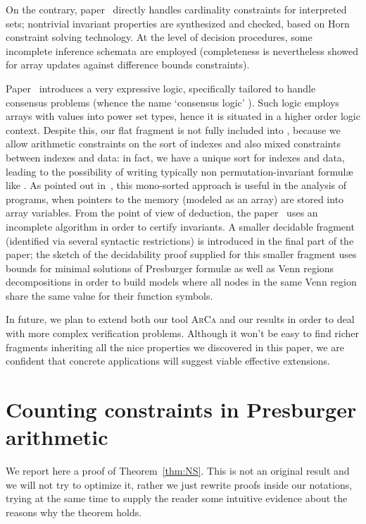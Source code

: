 \documentclass[11pt,a4paper]{article}
\newcommand{\formulae}{formul\ae\xspace}
\begin{document}
{On the contrary, paper~\cite{sharpie} directly handles cardinality constraints for interpreted sets; nontrivial  invariant properties are synthesized and checked, 
based on Horn constraint solving technology. At the level of decision procedures, some incomplete inference schemata are employed (completeness is nevertheless showed for 
array updates against difference bounds constraints).

Paper~\cite{consensus} introduces a very expressive logic, specifically tailored to handle consensus problems (whence the name `consensus logic' ). Such logic employs arrays with values into power set types, hence it is
situated in a higher order logic context. Despite this, our flat fragment is not fully included into , because we allow arithmetic constraints on the sort of 
indexes  and also mixed constraints between indexes and data: in fact, we have a unique sort for indexes and data, leading to the possibility of writing typically non permutation-invariant \formulae like . As pointed out in~\cite{AlbertiGS14}, this mono-sorted approach is useful in the analysis of programs, when pointers to the memory (modeled
as an array) are stored into array variables. From the point of view of deduction, the paper~\cite{consensus} uses an incomplete algorithm in order to certify   invariants. A smaller decidable fragment (identified via several syntactic restrictions) is introduced in the final part of the paper; 
the sketch of the decidability proof supplied for this smaller fragment uses bounds for minimal solutions of Presburger \formulae as well as Venn regions decompositions in order to build models 
where all  nodes in the same Venn region share the same value for their function symbols.

In future, we plan to extend both our tool \textsc{ArCa} and our results in order  to deal with more complex verification problems. Although it won't be easy to find richer fragments inheriting all the nice properties we discovered in this paper, we are confident that concrete applications will suggest viable effective extensions.





\vfill\eject 
\appendix


\section{Counting constraints in Presburger arithmetic}\label{app:counting}

We report here a proof of Theorem~\ref{thm:NS}. This is not an original result and we will not try to optimize it, rather we just rewrite  proofs inside our notations, 
trying at the same time to supply the reader some intuitive evidence about the reasons why the theorem
holds.


}
\end{document}
